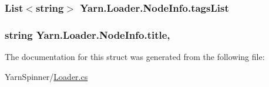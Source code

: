 \hypertarget{a00114_ab5010cc4c731e0da871e6002e5fb99a1}{
\subsubsection[{tags\-List}]{\setlength{\rightskip}{0pt plus 5cm}List$<$string$>$ Yarn.\-Loader.\-Node\-Info.\-tags\-List\hspace{0.3cm}{\ttfamily [get]}}}\label{a00114_ab5010cc4c731e0da871e6002e5fb99a1}
\hypertarget{a00114_aafc45bbc86a9acb9bdbcf7877695a96c}{
\subsubsection[{title}]{\setlength{\rightskip}{0pt plus 5cm}string Yarn.\-Loader.\-Node\-Info.\-title\hspace{0.3cm}{\ttfamily [get]}, {\ttfamily [set]}}}\label{a00114_aafc45bbc86a9acb9bdbcf7877695a96c}


The documentation for this struct was generated from the following file\-:\begin{DoxyCompactItemize}
\item 
Yarn\-Spinner/\hyperlink{a00268}{Loader.\-cs}\end{DoxyCompactItemize}
